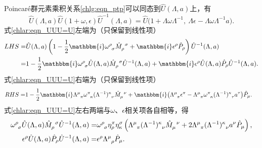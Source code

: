 Poincar\'e群元素乘积关系\eqref{chlg:eqn_ptp}可以同态到$\hat{U}(\Lambda,a)$上，有
\begin{equation}\label{chlar:eqn_UUU=U}
	\hat{U}(\Lambda,a)\hat{U}(1+\omega,\epsilon)\hat{U}^{-1}(\Lambda,a)
	=\hat{U}\bigl(1+\Lambda\omega\Lambda^{-1},\  \Lambda\epsilon -\Lambda\omega\Lambda^{-1}a \bigr).
\end{equation}
式\eqref{chlar:eqn_UUU=U}左端为（只保留到线性项）
\begin{align*}
	LHS=&\hat{U}(\Lambda,a)\left(1-\frac{1}{2}\mathbbm{i} \omega^{\rho}_{\hphantom{\rho}\sigma} 
	\hat{M}^{\hphantom{\rho}\sigma}_{\rho}
	+\mathbbm{i}\epsilon^{\rho}\hat{P}_{\rho} \right)\hat{U}^{-1}(\Lambda,a) \\
	=&1-\frac{1}{2}\mathbbm{i}  \omega^{\rho}_{\hphantom{\rho}\sigma}  \hat{U}(\Lambda,a)
	\hat{M}^{\hphantom{\rho}\sigma}_{\rho} \hat{U}^{-1}(\Lambda,a) 
	+\mathbbm{i}\epsilon^{\rho}\hat{U}(\Lambda,a)\hat{P}_{\rho}\hat{U}^{-1}(\Lambda,a) .
\end{align*}
式\eqref{chlar:eqn_UUU=U}右端为（只保留到线性项）
\begin{align*}
	RHS=&1 -\frac{1}{2}\mathbbm{i}  \Lambda^{\mu}_{\hphantom{\mu}\pi} 
	\omega^\pi_{\hphantom{\pi} \kappa} (\Lambda^{-1})^\kappa_{\hphantom{\pi}\nu} 
	\hat{M}^{\hphantom{\mu}\nu}_{\mu}
	+\mathbbm{i}\bigl(\Lambda^{\mu}_{\hphantom{\mu}\pi} \epsilon^\pi
	- \Lambda^{\mu}_{\hphantom{\mu}\pi} \omega^\pi_{\hphantom{\pi} \kappa} 
	(\Lambda^{-1})^\kappa_{\hphantom{\pi}\tau} a^\tau \bigr) \hat{P}_{\mu} .
\end{align*}
式\eqref{chlar:eqn_UUU=U}左右两端与$\omega$、$\epsilon$相关项各自相等，得
\begin{align*}
	\omega^{\rho}_{\hphantom{\rho}\sigma}  \hat{U}(\Lambda,a)
	\hat{M}^{\hphantom{\rho}\sigma}_{\rho} \hat{U}^{-1}(\Lambda,a) =&
	\omega^\rho_{\hphantom{\rho} \sigma} \eta^\pi_\rho \eta_\kappa^\sigma \left(
	\Lambda^{\mu}_{\hphantom{\mu}\pi}  (\Lambda^{-1})^\kappa_{\hphantom{\pi}\nu} 
	\hat{M}^{\hphantom{\mu}\nu}_{\mu}+ 2 \Lambda^{\mu}_{\hphantom{\mu}\pi}  
	(\Lambda^{-1})^\kappa_{\hphantom{\pi}\nu} a^\nu  \hat{P}_{\mu}     \right), \\
	\epsilon^{\rho}\hat{U}(\Lambda,a)\hat{P}_{\rho}\hat{U}^{-1}(\Lambda,a) =&
	\epsilon^\rho \Lambda^{\mu}_{\hphantom{\mu}\rho}  \hat{P}_{\mu} .
\end{align*}
